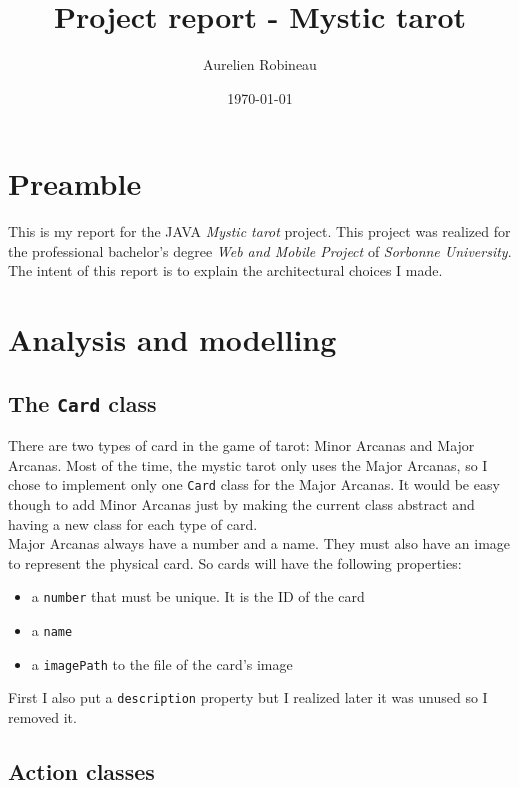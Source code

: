\documentclass{article}
\title{Project report - Mystic tarot}
\author{Aurelien Robineau}
\date{\today}
\begin{document}
\begin{titlepage}
\maketitle
\end{titlepage}

\section*{Preamble}
This is my report for the JAVA \textit{Mystic tarot} project. This project was
realized for the professional bachelor's degree \textit{Web and Mobile Project}
of \textit{Sorbonne University}.\\

\noindent
The intent of this report is to explain the architectural choices I made.

\section{Analysis and modelling}

\subsection{The \texttt{Card} class}
There are two types of card in the game of tarot: Minor Arcanas and
Major Arcanas. Most of the time, the mystic tarot only uses the Major
Arcanas, so I chose to implement only one \texttt{Card} class for the
Major Arcanas. It would be easy though to add Minor Arcanas just by
making the current class abstract and having a new class for each type
of card.\\

\noindent
Major Arcanas always have a number and a name. They must also have an
image to represent the physical card. So cards will have the following
properties:

\begin{itemize}
\itemsep0pt\parskip0pt
\item a \texttt{number} that must be unique. It is the ID of the card
\item a \texttt{name}
\item a \texttt{imagePath} to the file of the card's image
\end{itemize}

\noindent
First I also put a \texttt{description} property but I realized later it was
unused so I removed it.

\subsection{Action classes}
\end{document}
